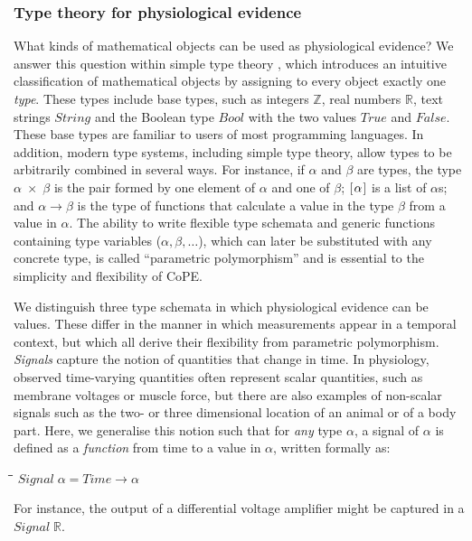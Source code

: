 \documentclass[11pt]{article}
\newlength{\lwidth}\setlength{\lwidth}{4.5cm}
\newlength{\cwidth}\setlength{\cwidth}{8mm} %
\newcommand{\Conid}[1]{\mathit{#1}}
\begin{document}
\subsubsection*{Type theory for physiological evidence}

What kinds of mathematical objects can be used as physiological
evidence? We answer this question within simple type theory
\citep{Pierce2002, Hindley2008}, which introduces an intuitive
classification of mathematical objects by assigning to every object
exactly one \emph{type}. These types include base types, such as
integers \ensuremath{\mathbb{Z}}, real numbers \ensuremath{\mathbb{R}}, text strings \ensuremath{\Conid{String}} and the
Boolean type \ensuremath{\Conid{Bool}} with the two values \ensuremath{\Conid{True}} and \ensuremath{\Conid{False}}. These base
types are familiar to users of most programming languages. In
addition, modern type systems, including simple type theory, allow
types to be arbitrarily combined in several ways. For instance, if
\ensuremath{\alpha} and \ensuremath{\beta} are types, the type \ensuremath{\alpha\;\!\!\times\!\!\;\beta} is the pair
formed by one element of \ensuremath{\alpha} and one of \ensuremath{\beta}; \ensuremath{[\mskip1.5mu \alpha\mskip1.5mu]} is a
list of \ensuremath{\alpha}s; and \ensuremath{\alpha\to \beta} is the type of functions that
calculate a value in the type \ensuremath{\beta} from a value in \ensuremath{\alpha}. The
ability to write flexible type schemata and generic functions
containing type variables ($\alpha, \beta, \ldots$), which can later
be substituted with any concrete type, is called ``parametric
polymorphism''\citep{Pierce2002} and is essential to the simplicity
and flexibility of CoPE.

We distinguish three type schemata in which physiological evidence can
be values. These differ in the manner in which measurements appear in
a temporal context, but which all derive their flexibility from
parametric polymorphism. \emph{Signals} capture the notion of
quantities that change in time. In physiology, observed time-varying
quantities often represent scalar quantities, such as membrane
voltages or muscle force, but there are also examples of non-scalar
signals such as the two- or three dimensional location of an animal or
of a body part. Here, we generalise this notion such that for
\emph{any} type \ensuremath{\alpha}, a signal of \ensuremath{\alpha} is defined as a
\emph{function} from time to a value in \ensuremath{\alpha}, written formally as:
\begin{tabbing}
\qquad\=\hspace{\lwidth}\=\hspace{\cwidth}\=\+\kill
${\Conid{Signal}\;\alpha\mathrel{=}\Conid{Time}\to \alpha}$
\end{tabbing}For instance, the output of a differential
voltage amplifier might be captured in a \ensuremath{\Conid{Signal}\;\mathbb{R}}.
\end{document}
